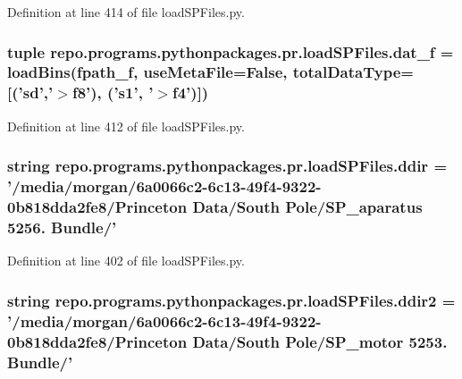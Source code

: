 Definition at line 414 of file load\-S\-P\-Files.\-py.

\hypertarget{namespacerepo_1_1programs_1_1pythonpackages_1_1pr_1_1loadSPFiles_a8966ac451acc4e186f9a8c9d299da497}{
\subsubsection[{dat\-\_\-f}]{\setlength{\rightskip}{0pt plus 5cm}tuple repo.\-programs.\-pythonpackages.\-pr.\-load\-S\-P\-Files.\-dat\-\_\-f = {\bf load\-Bins}({\bf fpath\-\_\-f}, use\-Meta\-File=False, total\-Data\-Type=\mbox{[}('sd','$>$f8'), ('s1', '$>$f4')\mbox{]})}}\label{namespacerepo_1_1programs_1_1pythonpackages_1_1pr_1_1loadSPFiles_a8966ac451acc4e186f9a8c9d299da497}


Definition at line 412 of file load\-S\-P\-Files.\-py.

\hypertarget{namespacerepo_1_1programs_1_1pythonpackages_1_1pr_1_1loadSPFiles_a65abcc2d7333a2e99d3d3376b616f959}{
\subsubsection[{ddir}]{\setlength{\rightskip}{0pt plus 5cm}string repo.\-programs.\-pythonpackages.\-pr.\-load\-S\-P\-Files.\-ddir = '/media/morgan/6a0066c2-\/6c13-\/49f4-\/9322-\/0b818dda2fe8/\-Princeton Data/\-South Pole/\-S\-P\-\_\-aparatus 5256. Bundle/'}}\label{namespacerepo_1_1programs_1_1pythonpackages_1_1pr_1_1loadSPFiles_a65abcc2d7333a2e99d3d3376b616f959}


Definition at line 402 of file load\-S\-P\-Files.\-py.

\hypertarget{namespacerepo_1_1programs_1_1pythonpackages_1_1pr_1_1loadSPFiles_a39efcdddf61ee790cdf9c4dfbd9e7080}{
\subsubsection[{ddir2}]{\setlength{\rightskip}{0pt plus 5cm}string repo.\-programs.\-pythonpackages.\-pr.\-load\-S\-P\-Files.\-ddir2 = '/media/morgan/6a0066c2-\/6c13-\/49f4-\/9322-\/0b818dda2fe8/\-Princeton Data/\-South Pole/\-S\-P\-\_\-motor 5253. Bundle/'}}\label{namespacerepo_1_1programs_1_1pythonpackages_1_1pr_1_1loadSPFiles_a39efcdddf61ee790cdf9c4dfbd9e7080}


